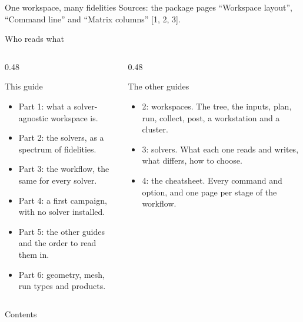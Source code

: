 \documentclass[aspectratio=169,11pt]{beamer}
\begin{document}
  {One workspace, many fidelities}
  {Sources: the package pages ``Workspace layout'', ``Command line'' and
   ``Matrix columns'' [1, 2, 3].}

\begin{frame}{Who reads what}
\begin{columns}[T]
\begin{column}{0.48\textwidth}
\begin{block}{This guide}
\begin{itemize}\small
  \item Part 1: what a solver-agnostic workspace is.
  \item Part 2: the solvers, as a spectrum of fidelities.
  \item Part 3: the workflow, the same for every solver.
  \item Part 4: a first campaign, with no solver installed.
  \item Part 5: the other guides and the order to read them in.
  \item Part 6: geometry, mesh, run types and products.
\end{itemize}
\end{block}
\end{column}
\begin{column}{0.48\textwidth}
\begin{block}{The other guides}
\begin{itemize}\small
  \item 2: workspaces. The tree, the inputs, plan, run, collect, post, a
        workstation and a cluster.
  \item 3: solvers. What each one reads and writes, what differs, how to
        choose.
  \item 4: the cheatsheet. Every command and option, and one page per stage
        of the workflow.
\end{itemize}
\end{block}
\end{column}
\end{columns}
\end{frame}

\begin{frame}{Contents}
\tableofcontents
\end{frame}




\end{document}
